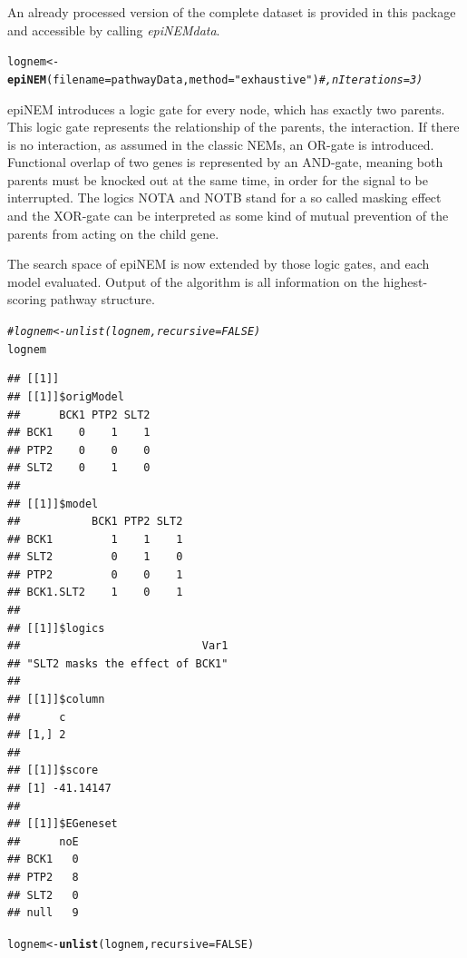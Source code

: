 \documentclass[paper=a4,notitlepage,DIV=12]{scrartcl}\usepackage[]{graphicx}\usepackage[]{color}
\makeatletter
\newcommand{\hlnum}[1]{\textcolor[rgb]{0.686,0.059,0.569}{#1}}%
\newcommand{\hlstr}[1]{\textcolor[rgb]{0.192,0.494,0.8}{#1}}%
\newcommand{\hlcom}[1]{\textcolor[rgb]{0.678,0.584,0.686}{\textit{#1}}}%
\newcommand{\hlstd}[1]{\textcolor[rgb]{0.345,0.345,0.345}{#1}}%
\newcommand{\hlkwb}[1]{\textcolor[rgb]{0.69,0.353,0.396}{#1}}%
\newcommand{\hlkwc}[1]{\textcolor[rgb]{0.333,0.667,0.333}{#1}}%
\newcommand{\hlkwd}[1]{\textcolor[rgb]{0.737,0.353,0.396}{\textbf{#1}}}%
\newenvironment{kframe}{%
 \def\at@end@of@kframe{}%
 \ifinner\ifhmode%
  \def\at@end@of@kframe{\end{minipage}}%
  \begin{minipage}{\columnwidth}%
 \fi\fi%
 \def\FrameCommand##1{\hskip\@totalleftmargin \hskip-\fboxsep
 \colorbox{shadecolor}{##1}\hskip-\fboxsep
     \hskip-\linewidth \hskip-\@totalleftmargin \hskip\columnwidth}%
 \MakeFramed {\advance\hsize-\width
   \@totalleftmargin\z@ \linewidth\hsize
   \@setminipage}}%
 {\par\unskip\endMakeFramed%
 \at@end@of@kframe}
\newenvironment{knitrout}{}{} %
\makeatother
\begin{document}
An already processed version of the complete dataset is provided in this package and accessible by calling \emph{epiNEMdata}.

\begin{knitrout}
\color{fgcolor}\begin{kframe}
\begin{alltt}
\hlstd{lognem} \hlkwb{<-} \hlkwd{epiNEM}\hlstd{(}\hlkwc{filename}\hlstd{=pathwayData,} \hlkwc{method} \hlstd{=} \hlstr{"exhaustive"}\hlstd{)}\hlcom{#, nIterations=3)}
\end{alltt}
\end{kframe}
\end{knitrout}

epiNEM introduces a logic gate for every node, which has exactly two parents. This logic gate represents the relationship of the parents, the interaction. If there is no interaction, as assumed in the classic NEMs, an OR-gate is introduced. Functional overlap of two genes is represented by an AND-gate, meaning both parents must be knocked out at the same time, in order for the signal to be interrupted. The logics NOTA and NOTB stand for a so called masking effect and the XOR-gate can be interpreted as some kind of mutual prevention of the parents from acting on the child gene.

The search space of epiNEM is now extended by those logic gates, and each model evaluated. Output of the algorithm is all information on the highest-scoring pathway structure.

\begin{knitrout}
\color{fgcolor}\begin{kframe}
\begin{alltt}
\hlcom{#lognem <- unlist(lognem, recursive = FALSE)}
\hlstd{lognem}
\end{alltt}
\begin{verbatim}
## [[1]]
## [[1]]$origModel
##      BCK1 PTP2 SLT2
## BCK1    0    1    1
## PTP2    0    0    0
## SLT2    0    1    0
## 
## [[1]]$model
##           BCK1 PTP2 SLT2
## BCK1         1    1    1
## SLT2         0    1    0
## PTP2         0    0    1
## BCK1.SLT2    1    0    1
## 
## [[1]]$logics
##                            Var1 
## "SLT2 masks the effect of BCK1" 
## 
## [[1]]$column
##      c
## [1,] 2
## 
## [[1]]$score
## [1] -41.14147
## 
## [[1]]$EGeneset
##      noE
## BCK1   0
## PTP2   8
## SLT2   0
## null   9
\end{verbatim}
\begin{alltt}
\hlstd{lognem} \hlkwb{<-} \hlkwd{unlist}\hlstd{(lognem,} \hlkwc{recursive} \hlstd{=} \hlnum{FALSE}\hlstd{)}
\end{alltt}
\end{kframe}
\end{knitrout}
\end{document}
